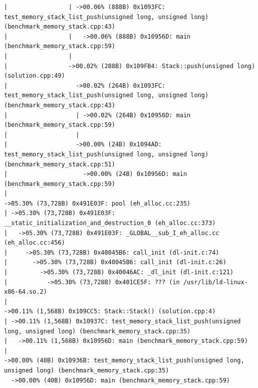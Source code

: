 \begin{lstlisting}[caption={}, label={}, style=style_code_block]
|                 | ->00.06% (888B) 0x1093FC: test_memory_stack_list_push(unsigned long, unsigned long) (benchmark_memory_stack.cpp:43)
|                 |   ->00.06% (888B) 0x10956D: main (benchmark_memory_stack.cpp:59)
|                 |     
|                 ->00.02% (288B) 0x109FB4: Stack::push(unsigned long) (solution.cpp:49)
|                   ->00.02% (264B) 0x1093FC: test_memory_stack_list_push(unsigned long, unsigned long) (benchmark_memory_stack.cpp:43)
|                   | ->00.02% (264B) 0x10956D: main (benchmark_memory_stack.cpp:59)
|                   |   
|                   ->00.00% (24B) 0x1094AD: test_memory_stack_list_push(unsigned long, unsigned long) (benchmark_memory_stack.cpp:51)
|                     ->00.00% (24B) 0x10956D: main (benchmark_memory_stack.cpp:59)
|                       
->05.30% (73,728B) 0x491E03F: pool (eh_alloc.cc:235)
| ->05.30% (73,728B) 0x491E03F: __static_initialization_and_destruction_0 (eh_alloc.cc:373)
|   ->05.30% (73,728B) 0x491E03F: _GLOBAL__sub_I_eh_alloc.cc (eh_alloc.cc:456)
|     ->05.30% (73,728B) 0x40045B6: call_init (dl-init.c:74)
|       ->05.30% (73,728B) 0x40045B6: call_init (dl-init.c:26)
|         ->05.30% (73,728B) 0x40046AC: _dl_init (dl-init.c:121)
|           ->05.30% (73,728B) 0x401CE5F: ??? (in /usr/lib/ld-linux-x86-64.so.2)
|             
->00.11% (1,568B) 0x109CC5: Stack::Stack() (solution.cpp:4)
| ->00.11% (1,568B) 0x10937C: test_memory_stack_list_push(unsigned long, unsigned long) (benchmark_memory_stack.cpp:35)
|   ->00.11% (1,568B) 0x10956D: main (benchmark_memory_stack.cpp:59)
|     
->00.00% (40B) 0x10936B: test_memory_stack_list_push(unsigned long, unsigned long) (benchmark_memory_stack.cpp:35)
  ->00.00% (40B) 0x10956D: main (benchmark_memory_stack.cpp:59)
\end{lstlisting}

